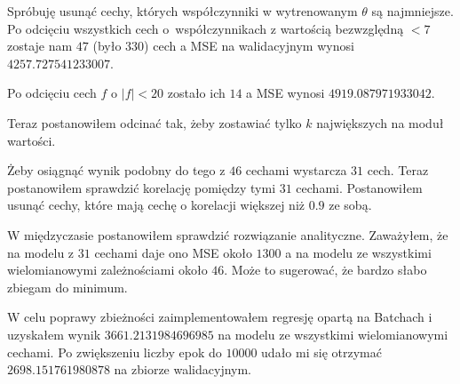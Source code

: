 \documentclass{article}
\begin{document}
  Spróbuję usunąć cechy, których współczynniki w wytrenowanym $\theta$ są najmniejsze. 
  Po odcięciu wszystkich cech o~współczynnikach z wartością bezwzględną $<7$ zostaje nam $47$ (było $330$) cech a MSE na walidacyjnym wynosi $4257.727541233007$.

  Po odcięciu cech $f$ o $|f| < 20$ zostało ich $14$ a MSE wynosi $4919.087971933042$.

  Teraz postanowiłem odcinać tak, żeby zostawiać tylko $k$ największych na moduł wartości.

  Żeby osiągnąć wynik podobny do tego z $46$ cechami wystarcza $31$ cech. 
  Teraz postanowiłem sprawdzić korelację pomiędzy tymi $31$ cechami. 
  Postanowiłem usunąć cechy, które mają cechę o korelacji większej niż $0.9$ ze sobą.


  W międzyczasie postanowiłem sprawdzić rozwiązanie analityczne. Zaważyłem, że na modelu z $31$ cechami daje ono MSE około $1300$ 
  a na modelu ze wszystkimi wielomianowymi zależnościami około $46$. Może to sugerować, że bardzo słabo zbiegam do minimum.
  
  W celu poprawy zbieżności zaimplementowałem regresję opartą na Batchach i uzyskałem wynik $3661.2131984696985$ na modelu ze wszystkimi wielomianowymi cechami.
  Po zwiększeniu liczby epok do $10000$ udało mi się otrzymać $2698.151761980878$ na zbiorze walidacyjnym.
\end{document}
